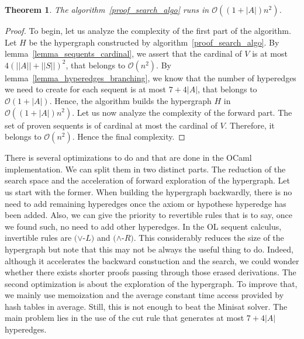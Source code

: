 \documentclass[a4paper, 11pt]{article}
\newtheorem{theorem}{Theorem}
\begin{document}
    \begin{theorem}\label{theorem_algo_complexity}
	    The algorithm~\ref{proof_search_algo} runs in $\mathcal{O}((1+|A|)n^2)$.
    \end{theorem}
    \begin{proof}
	    To begin, let us analyze the complexity of the first part of the algorithm. 
	    Let $H$ be the hypergraph constructed by algorithm~\ref{proof_search_algo}. By 
	    lemma~\ref{lemma_sequents_cardinal}, we assert that the cardinal of $V$ is at most 
	    $4(||A||+||S||)^2$, that belongs to $\mathcal{O}(n^2)$. By 
	    lemma~\ref{lemma_hyperedges_branching}, we know that the number
	    of hyperedges we need to create for each sequent is at most $7+4|A|$, that belongs to 
	    $\mathcal{O}(1+|A|)$.
	    Hence, the algorithm builds the hypergraph $H$ in $\mathcal{O}((1+|A|)n^2)$. Let us now 
	    analyze the complexity of the forward part. The set of proven sequents is of cardinal at 
	    most the cardinal of $V$. Therefore, it belongs to $\mathcal{O}(n^2)$. Hence the final
	    complexity. 
    \end{proof}
    There is several optimizations to do and that are done in the OCaml implementation. We can split
    them in two distinct parts. The reduction of the search space and the acceleration of forward
    exploration of the hypergraph. Let us start with the former. When building the hypergraph backwardly,
    there is no need to add remaining hyperedges once the axiom or hypothese hyperedge has been added.
    Also, we can give the priority to revertible rules that is to say, once we found such, no need
    to add other hyperedges. In the OL sequent calculus, invertible rules are $(\vee$-$L)$ and 
    $(\wedge$-$R)$. This considerably reduces the size of the hypergraph but note that this may not be
    always the useful thing to do. Indeed, although it accelerates the backward constuction and the 
    search, we could wonder whether there exists shorter proofs passing 
    through those erased derivations. The second optimization is about the exploration of the
    hypergraph. To improve that, we mainly use memoization and the average constant time access provided
    by hash tables in average.
    Still, this is not enough to beat the Minisat solver. The main problem lies in the use of the cut
    rule that generates at most $7+4|A|$ hyperedges. 
\end{document}
